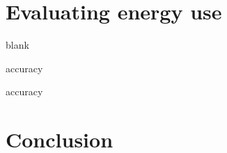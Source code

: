 \documentclass[presentation]{beamer}
\begin{document}
\section{Evaluating energy use}
\label{sec-3}

\begin{frame}[label=sec-3-1]{blank}

\end{frame}
\begin{frame}[label=sec-3-2]{accuracy}
\end{frame}
\begin{frame}[label=sec-3-3]{accuracy}
\end{frame}
\section{Conclusion}
\label{sec-4}
\end{document}
